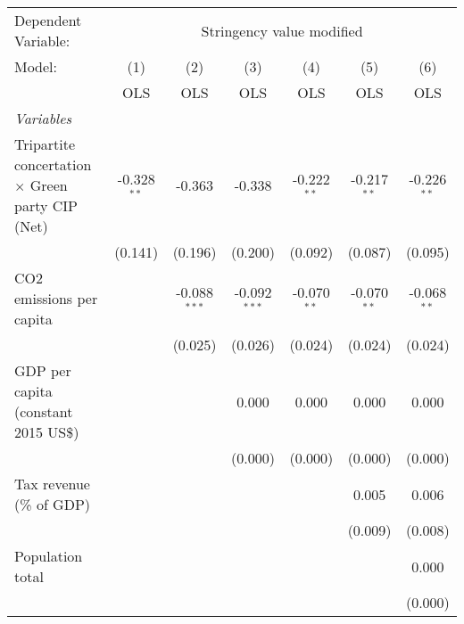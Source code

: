 
\begingroup
\centering
\begin{tabular}{lcccccc}
   \toprule
   Dependent Variable: & \multicolumn{6}{c}{Stringency value modified}\\
   Model:                                                  & (1)           & (2)            & (3)            & (4)           & (5)           & (6)\\  
                                                           &  OLS          & OLS            & OLS            & OLS           & OLS           & OLS\\  
   \midrule
   \emph{Variables}\\
   Tripartite concertation $\times$ Green party CIP (Net)  & -0.328$^{**}$ & -0.363         & -0.338         & -0.222$^{**}$ & -0.217$^{**}$ & -0.226$^{**}$\\   
                                                           & (0.141)       & (0.196)        & (0.200)        & (0.092)       & (0.087)       & (0.095)\\   
   CO2 emissions per capita                                &               & -0.088$^{***}$ & -0.092$^{***}$ & -0.070$^{**}$ & -0.070$^{**}$ & -0.068$^{**}$\\   
                                                           &               & (0.025)        & (0.026)        & (0.024)       & (0.024)       & (0.024)\\   
   GDP per capita (constant 2015 US\$)                     &               &                & 0.000          & 0.000         & 0.000         & 0.000\\   
                                                           &               &                & (0.000)        & (0.000)       & (0.000)       & (0.000)\\   
   Tax revenue (\% of GDP)                                 &               &                &                &               & 0.005         & 0.006\\   
                                                           &               &                &                &               & (0.009)       & (0.008)\\   
   Population total                                        &               &                &                &               &               & 0.000\\   
                                                           &               &                &                &               &               & (0.000)\\   

\end{tabular}
